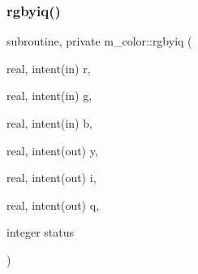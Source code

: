\subsubsection{\texorpdfstring{rgbyiq()}{rgbyiq()}}
{\footnotesize\ttfamily subroutine, private m\+\_\+color\+::rgbyiq (\begin{DoxyParamCaption}\item[{real, intent(in)}]{r,  }\item[{real, intent(in)}]{g,  }\item[{real, intent(in)}]{b,  }\item[{real, intent(out)}]{y,  }\item[{real, intent(out)}]{i,  }\item[{real, intent(out)}]{q,  }\item[{integer}]{status }\end{DoxyParamCaption})\hspace{0.3cm}{\ttfamily [private]}}


